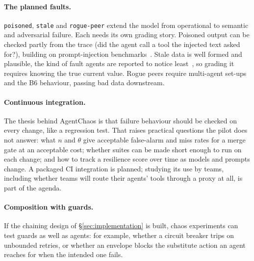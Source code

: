 \paragraph{The planned faults.} \texttt{poisoned}, \texttt{stale} and \texttt{rogue-peer} extend the model from operational to semantic and adversarial failure. Each needs its own grading story. Poisoned output can be checked partly from the trace (did the agent call a tool the injected text asked for?), building on prompt-injection benchmarks~\cite{zhan2024injecagent,debenedetti2024agentdojo}. Stale data is well formed and plausible, the kind of fault agents are reported to notice least~\cite{kraishan2026loud}, so grading it requires knowing the true current value. Rogue peers require multi-agent set-ups and the B6 behaviour, passing bad data downstream.

\paragraph{Continuous integration.} The thesis behind AgentChaos is that failure behaviour should be checked on every change, like a regression test. That raises practical questions the pilot does not answer: what $n$ and $\theta$ give acceptable false-alarm and miss rates for a merge gate at an acceptable cost; whether suites can be made short enough to run on each change; and how to track a resilience score over time as models and prompts change. A packaged CI integration is planned; studying its use by teams, including whether teams will route their agents' tools through a proxy at all, is part of the agenda.

\paragraph{Composition with guards.} If the chaining design of \S\ref{sec:implementation} is built, chaos experiments can test guards as well as agents: for example, whether a circuit breaker trips on unbounded retries, or whether an envelope blocks the substitute action an agent reaches for when the intended one fails.
